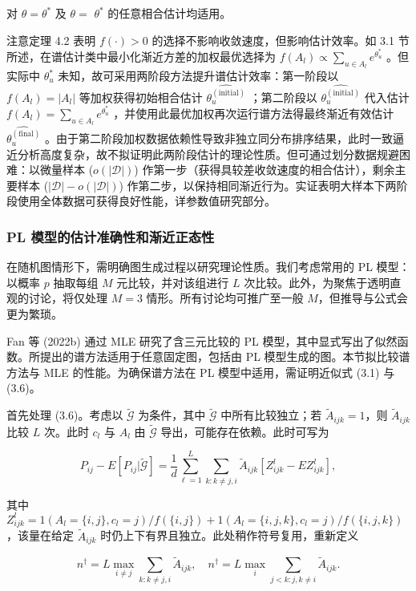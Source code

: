 对 $\theta = \theta^{*}$ 及 $\theta =$ $\theta^{*}$ 的任意相合估计均适用。

注意定理 4.2 表明 $f(\cdot) > 0$ 的选择不影响收敛速度，但影响估计效率。如 3.1 节所述，在谱估计类中最小化渐近方差的加权最优选择为 $f(A_{l})\propto \sum_{u\in A_{l}}e^{\theta_{u}^{*}}$ 。但实际中 $\theta_{u}^{*}$ 未知，故可采用两阶段方法提升谱估计效率：第一阶段以 $f(A_{l}) = |A_{l}|$ 等加权获得初始相合估计 $\widehat{\theta_{u}^{(\mathrm{initial})}}$ ；第二阶段以 $\widehat{\theta_{u}^{(\mathrm{initial})}}$ 代入估计 $f(A_{l}) = \sum_{u\in A_{l}}e^{\theta_{u}^{*}}$ ，并使用此最优加权再次运行谱方法得最终渐近有效估计 $\widehat{\theta_{u}^{(\mathrm{final})}}$ 。由于第二阶段加权数据依赖性导致非独立同分布排序结果，此时一致逼近分析高度复杂，故不拟证明此两阶段估计的理论性质。但可通过划分数据规避困难：以微量样本 ($o(|\mathcal{D}|)$) 作第一步（获得具较差收敛速度的相合估计），剩余主要样本 ($|\mathcal{D}| - o(|\mathcal{D}|)$) 作第二步，以保持相同渐近行为。实证表明大样本下两阶段使用全体数据可获得良好性能，详参数值研究部分。


\subsubsection{PL 模型的估计准确性和渐近正态性}

在随机图情形下，需明确图生成过程以研究理论性质。我们考虑常用的 PL 模型：以概率 $p$ 抽取每组 $M$ 元比较，并对该组进行 $L$ 次比较。此外，为聚焦于透明直观的讨论，将仅处理 $M = 3$ 情形。所有讨论均可推广至一般 $M$，但推导与公式会更为繁琐。

Fan 等 (2022b) 通过 MLE 研究了含三元比较的 PL 模型，其中显式写出了似然函数。所提出的谱方法适用于任意固定图，包括由 PL 模型生成的图。本节拟比较谱方法与 MLE 的性能。为确保谱方法在 PL 模型中适用，需证明近似式 (3.1) 与 (3.6)。

首先处理 (3.6)。考虑以 $\widetilde{\mathcal{G}}$ 为条件，其中 $\widetilde{\mathcal{G}}$ 中所有比较独立；若 $\widetilde{A}_{ijk} = 1$，则 $\widetilde{A}_{ijk}$ 比较 $L$ 次。此时 $c_{l}$ 与 $A_{l}$ 由 $\widetilde{\mathcal{G}}$ 导出，可能存在依赖。此时可写为

$$
P_{ij} - E[P_{ij}|\widetilde{\mathcal{G}} ] = \frac{1}{d}\sum_{\ell = 1}^{L}\sum_{k:k\neq j,i}\widetilde{A}_{ijk}[Z_{ijk}^{l} - EZ_{ijk}^{l}],
$$

其中 $Z_{ijk}^{l} = 1(A_{l} = \{i,j\} ,c_{l} = j) / f(\{i,j\}) + 1(A_{l} = \{i,j,k\} ,c_{l} = j) / f(\{i,j,k\})$，该量在给定 $\widetilde{A}_{ijk}$ 时仍上下有界且独立。此处稍作符号复用，重新定义

$$
n^{\dagger} = L\max_{i\neq j}\sum_{k:k\neq j,i}\widetilde{A}_{ijk},\quad n^{\dagger} = L\max_{i}\sum_{j< k:j,k\neq i}\widetilde{A}_{ijk}.
$$

